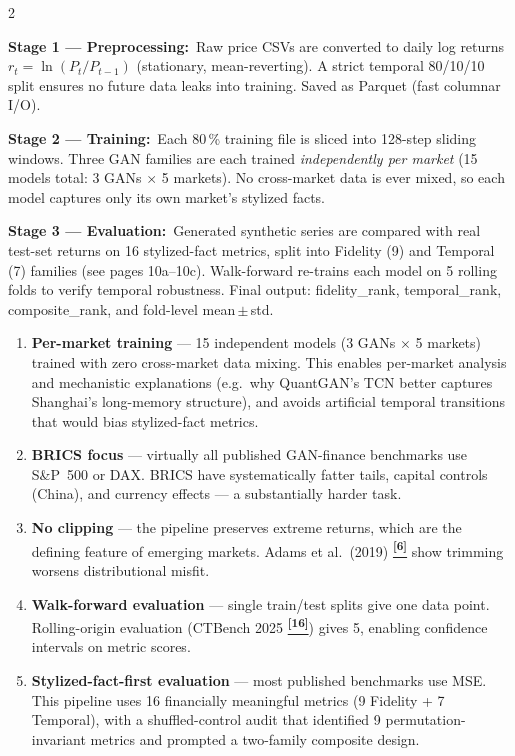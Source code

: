 \documentclass[10pt]{article}
\newcommand{\navybox}[2]{\begin{tcolorbox}[mybox={Navy}{LBg},title={#1}]#2\end{tcolorbox}}
\newcommand{\skybox}[2]{\begin{tcolorbox}[mybox={Sky}{BBg},title={#1}]#2\end{tcolorbox}}
\newcommand{\tcite}[1]{%
  \hyperlink{R:#1}{\textsuperscript{\scriptsize\textbf{[#1]}}}}
\begin{document}
\vspace{6pt}
\begin{multicols}{2}

\navybox{What Each Stage Does}{%
\textbf{Stage 1 — Preprocessing:}\ Raw price CSVs are converted to daily log returns
$r_t = \ln(P_t/P_{t-1})$ (stationary, mean-reverting). A strict temporal 80/10/10 split ensures no future data leaks into training. Saved as Parquet (fast columnar I/O).

\smallskip
\textbf{Stage 2 — Training:}\ Each 80\,\% training file is sliced into 128-step sliding windows. Three GAN families are each trained \emph{independently per market} (15 models total: 3 GANs $\times$ 5 markets). No cross-market data is ever mixed, so each model captures only its own market's stylized facts.

\smallskip
\textbf{Stage 3 — Evaluation:}\ Generated synthetic series are compared with real test-set returns on 16 stylized-fact metrics, split into Fidelity (9) and Temporal (7) families (see pages 10a--10c). Walk-forward re-trains each model on 5 rolling folds to verify temporal robustness. Final output: fidelity\_rank, temporal\_rank, composite\_rank, and fold-level mean\,$\pm$\,std.}

\skybox{What Makes This Pipeline Scientifically Novel}{%
\begin{enumerate}
  \item \textbf{Per-market training} --- 15 independent models (3 GANs $\times$ 5 markets) trained with zero cross-market data mixing. This enables per-market analysis and mechanistic explanations (e.g.\ why QuantGAN's TCN better captures Shanghai's long-memory structure), and avoids artificial temporal transitions that would bias stylized-fact metrics.
  \item \textbf{BRICS focus} --- virtually all published GAN-finance benchmarks use S\&P~500 or DAX. BRICS have systematically fatter tails, capital controls (China), and currency effects --- a substantially harder task.
  \item \textbf{No clipping} --- the pipeline preserves extreme returns, which are the defining feature of emerging markets. Adams et al.\ (2019)\tcite{6} show trimming worsens distributional misfit.
  \item \textbf{Walk-forward evaluation} --- single train/test splits give one data point. Rolling-origin evaluation (CTBench 2025\tcite{16}) gives 5, enabling confidence intervals on metric scores.
  \item \textbf{Stylized-fact-first evaluation} --- most published benchmarks use MSE. This pipeline uses 16 financially meaningful metrics (9 Fidelity + 7 Temporal), with a shuffled-control audit that identified 9 permutation-invariant metrics and prompted a two-family composite design.
\end{enumerate}}


\end{multicols}
\end{document}
